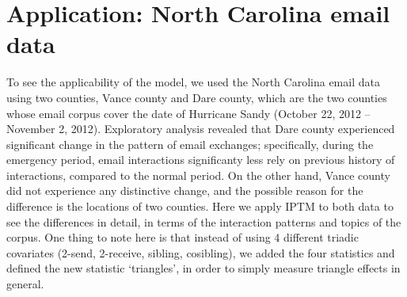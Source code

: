 \documentclass[a4paper]{article}
\begin{document}
\section{Application: North Carolina email data}
To see the applicability of the model, we used the North Carolina email data using two counties, Vance county and Dare county, which are the two counties whose email corpus cover the date of Hurricane Sandy (October 22, 2012 – November 2, 2012). Exploratory analysis revealed that Dare county experienced significant change in the pattern of email exchanges; specifically, during the emergency period, email interactions significanty less rely on previous history of interactions, compared to the normal period. On the other hand, Vance county did not experience any distinctive change, and the possible reason for the difference is the locations of two counties. Here we apply IPTM to both data to see the differences in detail, in terms of the interaction patterns and topics of the corpus. One thing to note here is that instead of using 4 different triadic covariates (2-send, 2-receive, sibling, cosibling), we added the four statistics and defined the new statistic `triangles', in order to simply measure triangle effects in general.
\end{document}
